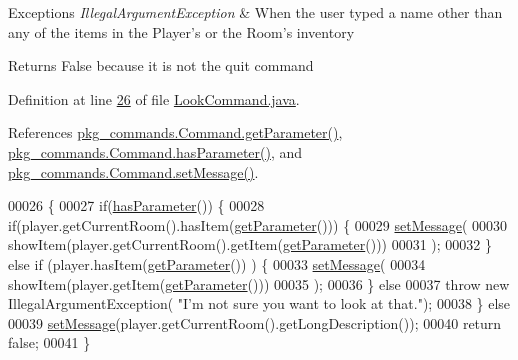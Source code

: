 \begin{DoxyExceptions}{Exceptions}
{\em Illegal\-Argument\-Exception} & When the user typed a name other than any of the items in the Player's or the Room's inventory \\
\hline
\end{DoxyExceptions}
\begin{DoxyReturn}{Returns}
False because it is not the quit command 
\end{DoxyReturn}


Definition at line \hyperlink{LookCommand_8java_source_l00026}{26} of file \hyperlink{LookCommand_8java_source}{Look\-Command.\-java}.



References \hyperlink{Command_8java_source_l00041}{pkg\-\_\-commands.\-Command.\-get\-Parameter()}, \hyperlink{Command_8java_source_l00073}{pkg\-\_\-commands.\-Command.\-has\-Parameter()}, and \hyperlink{Command_8java_source_l00089}{pkg\-\_\-commands.\-Command.\-set\-Message()}.


\begin{DoxyCode}
00026                                                                           \{
00027         \textcolor{keywordflow}{if}(\hyperlink{classpkg__commands_1_1Command_a02af95ab3f1898a66259ab7c177b6998}{hasParameter}()) \{
00028             \textcolor{keywordflow}{if}(player.getCurrentRoom().hasItem(\hyperlink{classpkg__commands_1_1Command_a41c92d445be73ea9d62320c65efb8434}{getParameter}())) \{
00029                 \hyperlink{classpkg__commands_1_1Command_ae210ff216fe908b111ba1c988a963d13}{setMessage}(
00030                         showItem(player.getCurrentRoom().getItem(\hyperlink{classpkg__commands_1_1Command_a41c92d445be73ea9d62320c65efb8434}{getParameter}()))
00031                         );
00032             \} \textcolor{keywordflow}{else} \textcolor{keywordflow}{if} (player.hasItem(\hyperlink{classpkg__commands_1_1Command_a41c92d445be73ea9d62320c65efb8434}{getParameter}()) ) \{
00033                 \hyperlink{classpkg__commands_1_1Command_ae210ff216fe908b111ba1c988a963d13}{setMessage}(
00034                         showItem(player.getItem(\hyperlink{classpkg__commands_1_1Command_a41c92d445be73ea9d62320c65efb8434}{getParameter}()))
00035                         );
00036             \} \textcolor{keywordflow}{else}
00037                 \textcolor{keywordflow}{throw} \textcolor{keyword}{new} IllegalArgumentException( \textcolor{stringliteral}{"I'm not sure you want to look at that."});
00038         \} \textcolor{keywordflow}{else}
00039             \hyperlink{classpkg__commands_1_1Command_ae210ff216fe908b111ba1c988a963d13}{setMessage}(player.getCurrentRoom().getLongDescription());
00040         \textcolor{keywordflow}{return} \textcolor{keyword}{false};
00041     \}
\end{DoxyCode}


